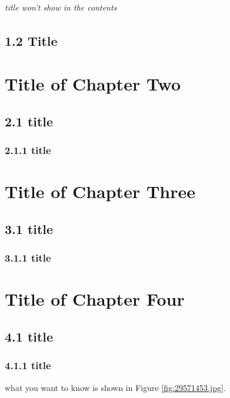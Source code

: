 \documentclass[a4paper,12pt,UTF8,openright]{book}
\begin{document}
\subparagraph{title won't show in the contents}
\lipsum[1-3]

\section{1.2 Title}
\lipsum[1-5]

\chapter{Title of Chapter Two}
\lipsum[1-3]

\section{2.1 title}
\lipsum[1-5]

\subsection{2.1.1 title}
\lipsum[1-5]

\chapter{Title of Chapter Three}
\lipsum[1-3]

\section{3.1 title}
\lipsum[1-5]

\subsection{3.1.1 title}
\lipsum[1-3]

\chapter{Title of Chapter Four}
\lipsum[1-5]

\section{4.1 title}
\lipsum[1-3]

\subsection{4.1.1 title}
\lipsum[1-3]

what you want to know is shown in Figure \ref{fig:29571453.jpg}.
\end{document}
